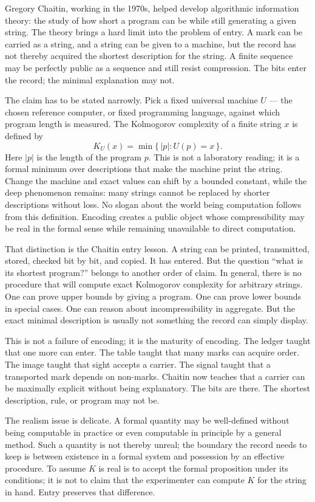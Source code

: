 Gregory Chaitin, working in the 1970s, helped develop algorithmic
information theory: the study of how short a program can be while still
generating a given string. The theory brings a hard limit into the problem of entry. A
mark can be carried as a string, and a string can be given to a machine,
but the record has not thereby acquired the shortest description for the
string. A finite sequence may be perfectly public as a sequence and still
resist compression. The bits enter the record; the minimal explanation
may not.

The claim has to be stated narrowly. Pick a fixed universal machine
\(U\) --- the chosen reference computer, or fixed programming language,
against which program length is measured. The Kolmogorov complexity of a
finite string \(x\) is defined by
\[
  K_U(x)=\min\{\, |p| : U(p)=x \,\}.
\]
Here \(|p|\) is the length of the program \(p\). This is not a laboratory
reading; it is a formal minimum over descriptions that make the machine
print the string. Change the machine and exact values can shift by a
bounded constant, while the deep phenomenon remains: many strings cannot
be replaced by shorter descriptions without loss. No slogan about the
world being computation follows from this definition. Encoding creates a
public object whose compressibility may be real in the formal sense while
remaining unavailable to direct computation.

That distinction is the Chaitin entry lesson. A string can be printed,
transmitted, stored, checked bit by bit, and copied. It has entered. But
the question ``what is its shortest program?'' belongs to another order of
claim. In general, there is no procedure that will compute exact
Kolmogorov complexity for arbitrary strings. One can prove upper bounds
by giving a program. One can prove lower bounds in special cases. One can
reason about incompressibility in aggregate. But the exact minimal
description is usually not something the record can simply display.

This is not a failure of encoding; it is the maturity of encoding. The
ledger taught that one more can enter. The table taught that many marks
can acquire order. The image taught that sight accepts a carrier. The
signal taught that a transported mark depends on non-marks. Chaitin now
teaches that a carrier can be maximally explicit without being
explanatory. The bits are there. The shortest description, rule, or
program may not be.

The realism issue is delicate. A formal quantity may be well-defined
without being computable in practice or even computable in principle by a
general method. Such a quantity is not thereby unreal; the
boundary the record needs to keep is between existence in a formal system
and possession by an effective procedure. To assume \(K\) is real is to accept the formal proposition
under its conditions; it is not to claim that the experimenter can
compute \(K\) for the string in hand. Entry preserves that difference.

